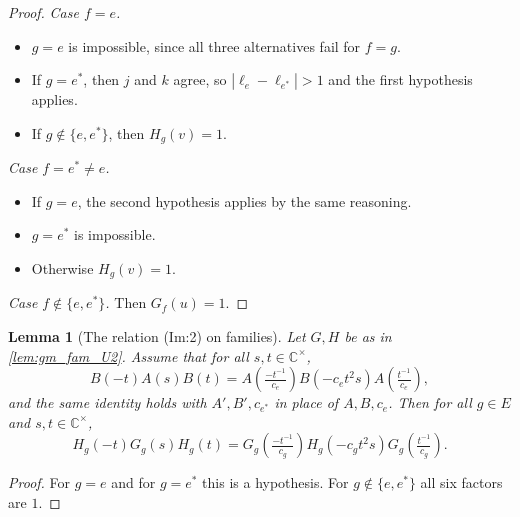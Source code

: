 \documentclass[11pt]{article}
\newtheorem{lemma}[theorem]{Lemma}
\theoremstyle{definition}
\theoremstyle{remark}
\newcommand{\CC}{\mathbb{C}}
\begin{document}
\begin{proof}
\emph{Case $f=e$.}
\begin{itemize}
\item $g=e$ is impossible, since all three alternatives fail for $f=g$.
\item If $g=e^\ast$, then $j$ and $k$ agree, so $|\ell_e-\ell_{e^\ast}|>1$ and the first hypothesis applies.
\item If $g\notin\{e,e^\ast\}$, then $H_g(v)=1$.
\end{itemize}

\emph{Case $f=e^\ast\neq e$.}
\begin{itemize}
\item If $g=e$, the second hypothesis applies by the same reasoning.
\item $g=e^\ast$ is impossible.
\item Otherwise $H_g(v)=1$.
\end{itemize}

\emph{Case $f\notin\{e,e^\ast\}$.} Then $G_f(u)=1$.
\end{proof}

\begin{lemma}[The relation (Im:2) on families]\label{lem:gm_fam_XY}
Let $G,H$ be as in \cref{lem:gm_fam_U2}. Assume that for all $s,t\in\CC^\times$,
\[
B(-t)A(s)B(t)=A\!\left(\tfrac{-t^{-1}}{c_e}\right)B(-c_et^2s)A\!\left(\tfrac{t^{-1}}{c_e}\right),
\]
and the same identity holds with $A',B',c_{e^\ast}$ in place of $A,B,c_e$. Then for all $g\in E$ and $s,t\in\CC^\times$,
\[
H_g(-t)G_g(s)H_g(t)=G_g\!\left(\tfrac{-t^{-1}}{c_g}\right)H_g(-c_gt^2s)G_g\!\left(\tfrac{t^{-1}}{c_g}\right).
\]
\end{lemma}

\begin{proof}
For $g=e$ and for $g=e^\ast$ this is a hypothesis. For $g\notin\{e,e^\ast\}$ all six factors are $1$.
\end{proof}
\end{document}
